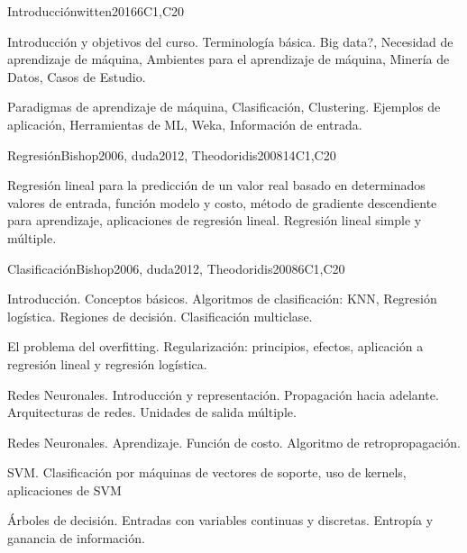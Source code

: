 \begin{syllabus}
\begin{competences}
    \item {}
\end{competences}

\begin{unit}{Introducción}{}{witten2016}{6}{C1,C20}
\begin{topics}
      \item Introducción y objetivos del curso. Terminología básica. Big data?, Necesidad de aprendizaje de máquina, Ambientes para el aprendizaje de máquina, Minería de Datos, Casos de Estudio. 
      \item Paradigmas de aprendizaje de máquina, Clasificación, Clustering. Ejemplos de aplicación, Herramientas de ML, Weka, Información de entrada.
   \end{topics}

\end{unit}

\begin{unit}{Regresión}{}{Bishop2006, duda2012, Theodoridis2008}{14}{C1,C20}
\begin{topics}
      \item Regresión lineal para la predicción de un valor real basado en determinados valores de entrada, función modelo y costo, método de gradiente descendiente para aprendizaje, aplicaciones de regresión lineal. Regresión lineal simple y múltiple.
    \end{topics}

\end{unit}

\begin{unit}{Clasificación}{}{Bishop2006, duda2012, Theodoridis2008}{6}{C1,C20}
\begin{topics}
      \item Introducción. Conceptos básicos. Algoritmos de clasificación: KNN, Regresión logística. Regiones de decisión. Clasificación multiclase.
      \item El problema del overfitting. Regularización: principios, efectos, aplicación a regresión lineal y regresión logística.
      \item Redes Neuronales. Introducción y representación. Propagación hacia adelante. Arquitecturas de redes. Unidades de salida múltiple.
      \item Redes Neuronales. Aprendizaje. Función de costo. Algoritmo de retropropagación.
      \item SVM. Clasificación por máquinas de vectores de soporte, uso de kernels, aplicaciones de SVM
      \item Árboles de decisión. Entradas con variables continuas y discretas. Entropía y ganancia de información.


\end{topics}
\end{unit}
\end{syllabus}
